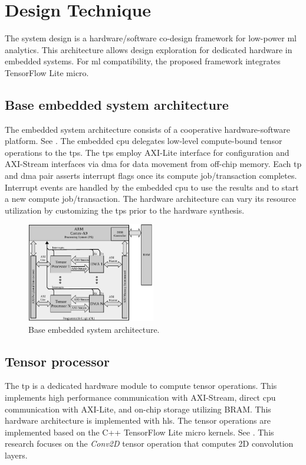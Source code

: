 \section{Design Technique}
\label{sec:system_design}
The system design is a hardware/software co-design framework for low-power \gls{ml} analytics. This architecture allows design exploration for dedicated hardware in embedded systems. For \gls{ml} compatibility, the proposed framework integrates TensorFlow Lite micro.

\subsection{Base embedded system architecture}
The embedded system architecture consists of a cooperative hardware-software platform. See . The embedded \gls{cpu} delegates low-level compute-bound tensor operations to the \glspl{tp}. The \glspl{tp} employ AXI-Lite interface for configuration and AXI-Stream interfaces via \gls{dma} for data movement from off-chip memory. Each \gls{tp} and \gls{dma} pair asserts interrupt flags once its compute job/transaction completes. Interrupt events are handled by the embedded \gls{cpu} to use the results and to start a new compute job/transaction. The hardware architecture can vary its resource utilization by customizing the \glspl{tp} prior to the hardware synthesis.
\begin{figure}
	\centering
	\includegraphics[width=0.5\textwidth]{./chapters/cnn_accelerator/figures/system_design.pdf}
	\caption{Base embedded system architecture.}
	\label{fig:system_architecture}
\end{figure}
\subsection{Tensor processor}
The \gls{tp} is a dedicated hardware module to compute tensor operations. This implements high performance communication with AXI-Stream, direct \gls{cpu} communication with AXI-Lite, and on-chip storage utilizing BRAM. This hardware architecture is implemented with \gls{hls}. The tensor operations are implemented based on the C++ TensorFlow Lite micro kernels. See . This research focuses on the \emph{Conv2D} tensor operation that computes 2D convolution layers.

